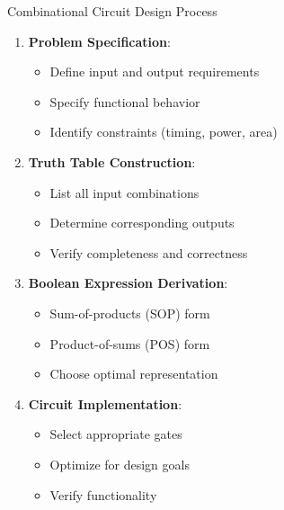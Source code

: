 \documentclass[aspectratio=169,11pt]{beamer}
\newcommand{\concept}[1]{\textbf{\color{accentcolor}#1}}
\begin{document}
\begin{frame}{Combinational Circuit Design Process}
\begin{enumerate}
\item \concept{Problem Specification}:
\begin{itemize}
\item Define input and output requirements
\item Specify functional behavior
\item Identify constraints (timing, power, area)
\end{itemize}
\vspace{0.3cm}
\item \concept{Truth Table Construction}:
\begin{itemize}
\item List all input combinations
\item Determine corresponding outputs
\item Verify completeness and correctness
\end{itemize}
\vspace{0.3cm}
\item \concept{Boolean Expression Derivation}:
\begin{itemize}
\item Sum-of-products (SOP) form
\item Product-of-sums (POS) form
\item Choose optimal representation
\end{itemize}
\vspace{0.3cm}
\item \concept{Circuit Implementation}:
\begin{itemize}
\item Select appropriate gates
\item Optimize for design goals
\item Verify functionality
\end{itemize}
\end{enumerate}
\end{frame}
\end{document}

